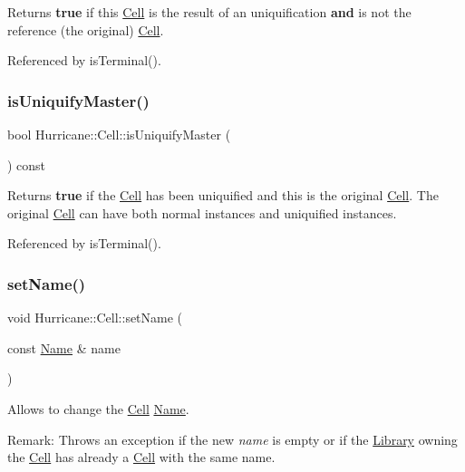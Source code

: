 Returns {\bfseries true} if this \hyperlink{classHurricane_1_1Cell}{Cell} is the result of an uniquification {\bfseries and} is not the reference (the original) \hyperlink{classHurricane_1_1Cell}{Cell}. 

Referenced by is\+Terminal().

\mbox{\label{classHurricane_1_1Cell_a0220dbbbe730e6874f7620135e9c10f6}} 
\subsubsection{\texorpdfstring{is\+Uniquify\+Master()}{isUniquifyMaster()}}
{\footnotesize\ttfamily bool Hurricane\+::\+Cell\+::is\+Uniquify\+Master (\begin{DoxyParamCaption}{ }\end{DoxyParamCaption}) const}

Returns {\bfseries true} if the \hyperlink{classHurricane_1_1Cell}{Cell} has been uniquified and this is the original \hyperlink{classHurricane_1_1Cell}{Cell}. The original \hyperlink{classHurricane_1_1Cell}{Cell} can have both normal instances and uniquified instances. 

Referenced by is\+Terminal().

\mbox{\label{classHurricane_1_1Cell_ad2c9face922062664110c66ee205eab2}} 
\subsubsection{\texorpdfstring{set\+Name()}{setName()}}
{\footnotesize\ttfamily void Hurricane\+::\+Cell\+::set\+Name (\begin{DoxyParamCaption}\item[{const \hyperlink{classHurricane_1_1Name}{Name} \&}]{name }\end{DoxyParamCaption})}

Allows to change the \hyperlink{classHurricane_1_1Cell}{Cell} \hyperlink{classHurricane_1_1Name}{Name}.

\begin{DoxyParagraph}{Remark\+:}
Throws an exception if the new {\itshape name} is empty or if the \hyperlink{classHurricane_1_1Library}{Library} owning the \hyperlink{classHurricane_1_1Cell}{Cell} has already a \hyperlink{classHurricane_1_1Cell}{Cell} with the same name. 
\end{DoxyParagraph}



